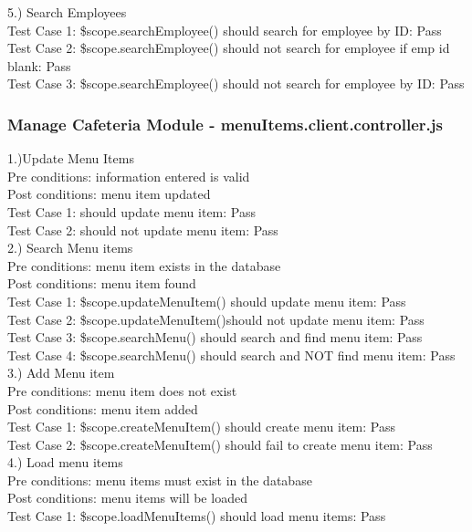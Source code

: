 \documentclass[a4paper,12pt]{report}
\begin{document}
5.) Search Employees \\
Test Case 1: \$scope.searchEmployee() should search for employee by ID: Pass \\
Test Case 2:  \$scope.searchEmployee() should not search for employee if emp id blank: Pass \\
Test Case 3: \$scope.searchEmployee() should not search for employee by ID: Pass \\

\subsubsection{Manage Cafeteria Module - menuItems.client.controller.js }
1.)Update Menu Items \\
Pre conditions: information entered is valid\\
Post conditions: menu item updated\\
Test Case 1: should update menu item: Pass \\
Test Case 2: should not update menu item: Pass \\

2.) Search Menu items \\
Pre conditions: menu item exists in the database \\
Post conditions: menu item found \\
Test Case 1: \$scope.updateMenuItem() should update menu item: Pass \\
Test Case 2: \$scope.updateMenuItem()should not update menu item: Pass \\
Test Case 3: \$scope.searchMenu() should search and find menu item: Pass \\
Test Case 4: \$scope.searchMenu() should search and NOT find menu item: Pass \\

3.) Add Menu item \\
Pre conditions: menu item does not exist\\
Post conditions: menu item added\\
Test Case 1: \$scope.createMenuItem() should create menu item: Pass\\
Test Case 2: \$scope.createMenuItem() should fail to create menu item: Pass\\

4.) Load menu items \\
Pre conditions: menu items must exist in the database\\
Post conditions: menu items will be loaded \\
Test Case 1: \$scope.loadMenuItems() should load menu items: Pass \\ 
\end{document}
